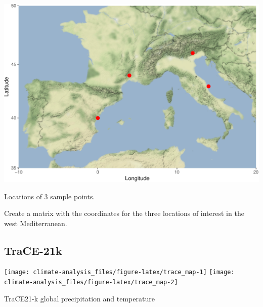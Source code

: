 \documentclass[11pt,]{tufte-handout}
\newenvironment{Shaded}{}{}
\newcommand{\KeywordTok}[1]{\textcolor[rgb]{0.00,0.44,0.13}{\textbf{{#1}}}}
\newcommand{\DataTypeTok}[1]{\textcolor[rgb]{0.56,0.13,0.00}{{#1}}}
\newcommand{\DecValTok}[1]{\textcolor[rgb]{0.25,0.63,0.44}{{#1}}}
\newcommand{\StringTok}[1]{\textcolor[rgb]{0.25,0.44,0.63}{{#1}}}
\newcommand{\CommentTok}[1]{\textcolor[rgb]{0.38,0.63,0.69}{\textit{{#1}}}}
\newcommand{\NormalTok}[1]{{#1}}
\begin{document}
\begin{marginfigure}
\includegraphics{climate-analysis_files/figure-latex/map-1} \caption[Locations of 3 sample points]{Locations of 3 sample points.}\label{fig:map}
\end{marginfigure}

Create a matrix with the coordinates for the three locations of interest
in the west Mediterranean.

\begin{Shaded}
\end{Shaded}

\subsection{TraCE-21k}\label{trace-21k}

\begin{marginfigure}
\texttt{[image: climate-analysis\_files/figure-latex/trace\_map-1]} \texttt{[image: climate-analysis\_files/figure-latex/trace\_map-2]} \caption[TraCE21-k global precipitation and temperature]{TraCE21-k global precipitation and temperature}\label{fig:trace_map}
\end{marginfigure}
\end{document}
